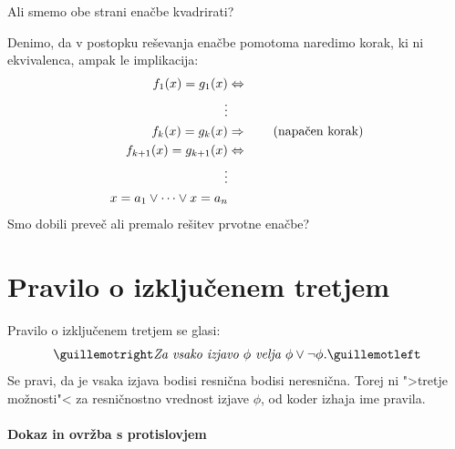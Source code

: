 \begin{vaja}
  Ali smemo obe strani enačbe kvadrirati?
\end{vaja}

\begin{vaja}
  Denimo, da v postopku reševanja enačbe pomotoma naredimo korak,
  ki ni ekvivalenca, ampak le implikacija:
  \begin{align*}
    f_1(x) = g_1(x) &\Leftrightarrow \\
    \vdots & \\
    f_k(x) = g_k(x) &\Rightarrow \tag{napačen korak}\\
    f_{k+1}(x) = g_{k+1}(x) &\Leftrightarrow \\
    \vdots & \\
    x = a_1 \lor \cdots \lor x = a_n&
  \end{align*}
  Smo dobili preveč ali premalo rešitev prvotne enačbe?
\end{vaja}


\section{Pravilo o izključenem tretjem}
\label{sec:lem}

Pravilo o izključenem tretjem se glasi:
%
\begin{equation*}
  \nls{Za vsako izjavo $\phi$ velja $\phi \lor \neg\phi$.}
\end{equation*}
%
Se pravi, da je vsaka izjava bodisi resnična bodisi neresnična.
%
Torej ni ">tretje možnosti"< za resničnostno vrednost izjave $\phi$,
od koder izhaja ime pravila.

\paragraph*{Dokaz in ovržba s protislovjem}

